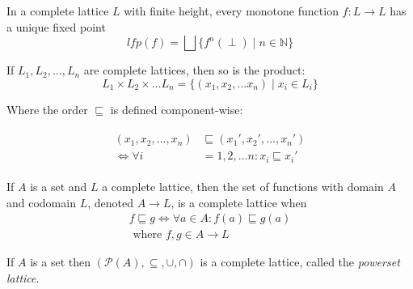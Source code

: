 

\begin{theorem}\label{thm:kleene_finite}
In a complete lattice $L$ with finite height, every monotone function $f : L \rightarrow L$ has a unique fixed point
\begin{equation}
    lfp(f) = \bigsqcup\{f^n(\perp) \mid n \in \mathbb{N}\}\label{eq:equation6}
\end{equation}
\end{theorem}


\begin{theorem}\label{thm:product-lattice}
    If $L_1, L_2, \dots, L_n$ are complete lattices, then so is the product:
    \begin{equation}
        L_1 \times L_2 \times \dots L_n = \{(x_1, x_2, \dots x_n) \mid x_i \in L_i\}\label{eq:equation7}
    \end{equation}

    Where the order $\sqsubseteq$ is defined component-wise:

    \begin{align}
        \begin{split}
        (x_1, x_2, \dots, x_n) &\sqsubseteq (x_1', x_2', \dots, x_n') \\
        \iff
        \forall i &= 1, 2, \dots n : x_i \sqsubseteq x_i'
        \end{split}
    \end{align}
\end{theorem}

\begin{theorem}
    If $A$ is a set and $L$ a complete lattice, then the set of functions with domain $A$ and codomain $L$, denoted $A \rightarrow L$, is a complete lattice when
    \begin{equation}
        \begin{split}
            f \sqsubseteq g \iff \forall a \in A : f(a) \sqsubseteq g(a) \\ \text{ where } f,g \in A \rightarrow L\label{eq:equation-complete-lattice-theorem}
        \end{split}
    \end{equation}
\end{theorem}

\begin{theorem}
    If $A$ is a set then $(\mathcal{P}(A), \subseteq, \cup, \cap)$ is a complete lattice, called the \emph{powerset lattice}.
\end{theorem}

